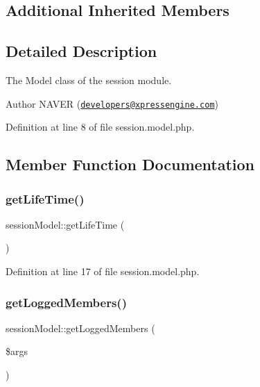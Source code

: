 \subsection*{Additional Inherited Members}


\subsection{Detailed Description}
The Model class of the session module. 

\begin{DoxyAuthor}{Author}
N\+A\+V\+ER (\href{mailto:developers@xpressengine.com}{\tt developers@xpressengine.\+com}) 
\end{DoxyAuthor}


Definition at line 8 of file session.\+model.\+php.



\subsection{Member Function Documentation}
\hypertarget{classsessionModel_a3c6de96ddf005e54fd486754acb4c28a}{}\label{classsessionModel_a3c6de96ddf005e54fd486754acb4c28a} 
\subsubsection{\texorpdfstring{get\+Life\+Time()}{getLifeTime()}}
{\footnotesize\ttfamily session\+Model\+::get\+Life\+Time (\begin{DoxyParamCaption}{ }\end{DoxyParamCaption})}



Definition at line 17 of file session.\+model.\+php.

\hypertarget{classsessionModel_ab6fda0dcadba97f36ceb3be8c207cadc}{}\label{classsessionModel_ab6fda0dcadba97f36ceb3be8c207cadc} 
\subsubsection{\texorpdfstring{get\+Logged\+Members()}{getLoggedMembers()}}
{\footnotesize\ttfamily session\+Model\+::get\+Logged\+Members (\begin{DoxyParamCaption}\item[{}]{\$args }\end{DoxyParamCaption})}



